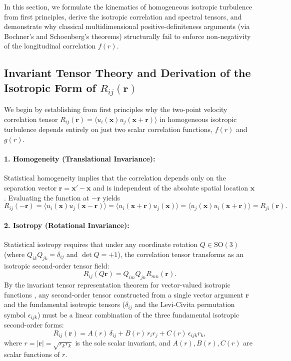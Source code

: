 \documentclass[lineno]{jfm}
\begin{document}
In this section, we formulate the kinematics of homogeneous isotropic turbulence from first principles, derive the isotropic correlation and spectral tensors, and demonstrate why classical multidimensional positive-definiteness arguments (via Bochner's and Schoenberg's theorems) structurally fail to enforce non-negativity of the longitudinal correlation $f(r)$.

\subsection{Invariant Tensor Theory and Derivation of the Isotropic Form of \texorpdfstring{$R_{ij}(\mathbf{r})$}{Rij(r)}}
\label{subsec:rij_derivation}

We begin by establishing from first principles why the two-point velocity correlation tensor $R_{ij}(\mathbf{r}) = \langle u_i(\mathbf{x}) u_j(\mathbf{x}+\mathbf{r}) \rangle$ in homogeneous isotropic turbulence depends entirely on just two scalar correlation functions, $f(r)$ and $g(r)$.

\paragraph{1. Homogeneity (Translational Invariance):}
Statistical homogeneity implies that the correlation depends only on the separation vector $\mathbf{r} = \mathbf{x}' - \mathbf{x}$ and is independent of the absolute spatial location $\mathbf{x}$. Evaluating the function at $-\mathbf{r}$ yields
\begin{equation}
R_{ij}(-\mathbf{r}) = \langle u_i(\mathbf{x}) u_j(\mathbf{x}-\mathbf{r}) \rangle = \langle u_i(\mathbf{x}+\mathbf{r}) u_j(\mathbf{x}) \rangle = \langle u_j(\mathbf{x}) u_i(\mathbf{x}+\mathbf{r}) \rangle = R_{ji}(\mathbf{r}).
\label{eq:Rij_homogeneity_sym}
\end{equation}

\paragraph{2. Isotropy (Rotational Invariance):}
Statistical isotropy requires that under any coordinate rotation $Q \in \mathrm{SO}(3)$ (where $Q_{ik} Q_{jk} = \delta_{ij}$ and $\det Q = +1$), the correlation tensor transforms as an isotropic second-order tensor field:
\begin{equation}
R_{ij}(Q\mathbf{r}) = Q_{im} Q_{jn} R_{mn}(\mathbf{r}).
\label{eq:Rij_rotation}
\end{equation}
By the invariant tensor representation theorem for vector-valued isotropic functions \citep{Robertson1940, Batchelor1953}, any second-order tensor constructed from a single vector argument $\mathbf{r}$ and the fundamental isotropic tensors ($\delta_{ij}$ and the Levi-Civita permutation symbol $\epsilon_{ijk}$) must be a linear combination of the three fundamental isotropic second-order forms:
\begin{equation}
R_{ij}(\mathbf{r}) = A(r)\,\delta_{ij} + B(r)\,r_i r_j + C(r)\,\epsilon_{ijk} r_k,
\label{eq:Rij_general_isotropic}
\end{equation}
where $r = |\mathbf{r}| = \sqrt{r_k r_k}$ is the sole scalar invariant, and $A(r), B(r), C(r)$ are scalar functions of $r$.
\end{document}
